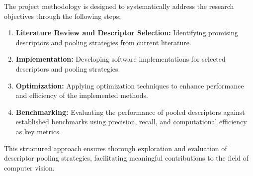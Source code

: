 The project methodology is designed to systematically address the research objectives through the following steps:

\begin{enumerate}
    \item \textbf{Literature Review and Descriptor Selection:} Identifying promising descriptors and pooling strategies from current literature.
    \item \textbf{Implementation:} Developing software implementations for selected descriptors and pooling strategies.
    \item \textbf{Optimization:} Applying optimization techniques to enhance performance and efficiency of the implemented methods.
    \item \textbf{Benchmarking:} Evaluating the performance of pooled descriptors against established benchmarks using precision, recall, and computational efficiency as key metrics.
\end{enumerate}

This structured approach ensures thorough exploration and evaluation of descriptor pooling strategies, facilitating meaningful contributions to the field of computer vision.
